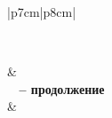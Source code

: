 \begin{longtable}{|p{7cm}|p{8cm}|}
 \caption[Описание методов класса (компонента) ThinkingLifeCycle]{Описание методов класса (компонента) ThinkingLifeCycle}\label{TLCCD} \\ 
 \hline
 
  &   \\ \hline 
\endfirsthead
{}%
{{\bfseries \tablename\ \thetable{} -- продолжение}} \\
\hline {} &
  \\ \hline 
\endhead

\hline {} \\ \hline
\endfoot


\end{longtable}
